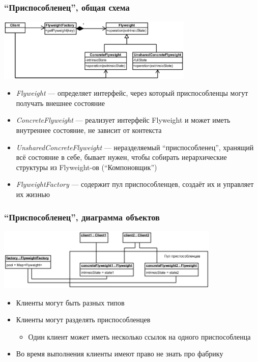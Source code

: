 \documentclass{../cscslides}
\begin{document}
    \begin{frame}
        \frametitle{``Приспособленец'', общая схема}
        \begin{center}
            \includegraphics[width=0.7\textwidth]{flyweight.png}
        \end{center}
        \begin{footnotesize}
            \begin{itemize}
                \item \textit{Flyweight} --- определяет интерфейс, через который приспособленцы могут получать внешнее состояние
                \item \textit{ConcreteFlyweight} --- реализует интерфейс Flyweight и может иметь внутреннее состояние, не зависит от контекста
                \item \textit{UnsharedConcreteFlyweight} --- неразделяемый ``приспособленец'', хранящий всё состояние в себе, бывает нужен, чтобы собирать иерархические структуры из Flyweight-ов (``Компоновщик'')
                \item \textit{FlyweightFactory} --- содержит пул приспособленцев, создаёт их и управляет их жизнью
            \end{itemize}
        \end{footnotesize}
    \end{frame}

    \begin{frame}
        \frametitle{``Приспособленец'', диаграмма объектов}
        \begin{center}
            \includegraphics[width=0.8\textwidth]{flyweightObjects.png}
        \end{center}
        \begin{itemize}
            \item Клиенты могут быть разных типов
            \item Клиенты могут разделять приспособленцев
            \begin{itemize}
                \item Один клиент может иметь несколько ссылок на одного приспособленца
            \end{itemize}
            \item Во время выполнения клиенты имеют право не знать про фабрику
        \end{itemize}
    \end{frame}
\end{document}
